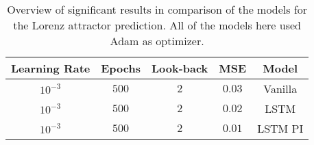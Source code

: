 \begin{table}[]
\begin{tabular}{ccccc}
\hline
Learning Rate & Epochs & Look-back & MSE    & Model   \\ \hline
 $10^{-3}$     & $500$  & $2$       & $0.03$ & Vanilla \\
 $10^{-3}$     & $500$  & $2$       & $0.02$ & LSTM    \\
 $10^{-3}$     & $500$  & $2$       & $0.01$ & LSTM PI
\end{tabular}
\caption{Overview of significant results in comparison of the models for the Lorenz attractor prediction. All of the models here used Adam as optimizer.}
\label{tab:compare}
\end{table}










